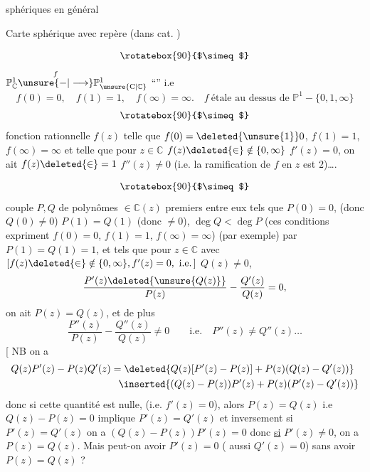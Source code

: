 \quad {} sphériques en général

Carte sphérique  avec repère (dans cat. )

\[
\rotatebox{90}{$\simeq$}
\]
 $\mathbb P^{1}_{\mathbb C}\overset{f}{\unsure{-|\longrightarrow}}\mathbb P^{1}_{\unsure{\mathrm C|\mathbb C}}$ ``'' i.e
\[
 f(0)=0,\quad f(1)=1,\quad f(\infty)=\infty.\quad f\ \text{étale au dessus de }\mathbb P^{1}-\{0,1,\infty\}
\]
\[
\rotatebox{90}{$\simeq$}
\]
fonction rationnelle $f(z)$ telle que $f(0)=\deleted{\unsure{1}}0$, $f(1)=1$, $f(\infty)=\infty$ et telle que pour $z\in\mathbb C$  $f(z)\deleted{\in}\notin\{0,\infty\}$ $f'(z)=0$, on ait $f(z)\deleted{\in}=1$ \unsure{$\}$|,}  $f''(z)\ne0$ (i.e. la ramification de $f$ en $z$ est $2$)\ldots.

\[
\rotatebox{90}{$\simeq$}
\]
couple $P,Q$ \inserted{$[f=P/Q\quad !\,]$} de polynômes $\in\mathbb C(z)$ premiers entre eux  tels que $P(0)=0$, (donc $Q(0)\ne0$) $P(1)=Q(1)$ (donc $\ne0$), $\deg Q<\deg P$ (ces conditions expriment  $f(0)=0$, $f(1)=1$, $f(\infty)=\infty$)
 (par exemple) par $P(1)=Q(1)=1$, et tels que pour $z\in\mathbb C$ avec $[f(z)\deleted{\in}\notin\{0,\infty\}, f'(z)=0,\ \mathrm{i.e.}\,]$  $Q(z)\ne0$,
\[
 \frac{P'(z)\deleted{\unsure{Q(z)}}}{P(z)}-\frac{Q'(z)}{Q(z)}=0,
\]
on ait $P(z)=Q(z)$, et de plus
\[
 \frac{P''(z)}{P(z)}-\frac{Q''(z)}{Q(z)}\ne0\qquad\text{i.e.}\quad P''(z)\ne Q''(z)\ldots
\]
[ NB on a
\[
\begin{aligned}
 Q(z)P'(z)-P(z)Q'(z)&=\deleted{Q(z)[P'(z)-P(z)]+P(z)(Q(z)-Q'(z))}\\
 &\phantom{=}\inserted{(Q(z)-P(z))P'(z)+P(z)(P'(z)-Q'(z))}
\end{aligned}
\]
donc si  cette quantité est nulle, (i.e. $f'(z)=0$), alors $P(z)=Q(z)$  i.e $Q(z)-P(z)=0$ implique $P'(z)=Q'(z)$ et inversement si $P'(z)=Q'(z)$ on a $(Q(z)-P(z))P'(z)=0$ donc \uline{si} $P'(z)\ne0$, on a $P(z)=Q(z)$. Mais peut-on avoir $P'(z)=0$ ( aussi $Q'(z)=0$) \unsure{$\}$|)} sans avoir $P(z)=Q(z)$ ?


